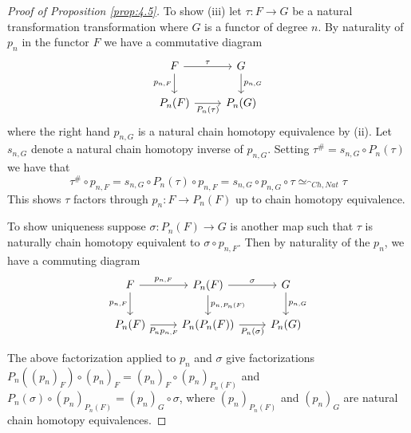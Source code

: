 \begin{proof}[Proof of Proposition \ref{prop:4.5}]
    \vspace{10pt}

    To show (iii) let $\tau:F\rightarrow G$ be a natural transformation transformation where $G$ is a functor of degree $n$. By naturality of $p_n$ in the functor $F$ we have a commutative diagram
    \[\begin{tikzcd}
    	F & G \\
    	{P_n(F)} & {P_n(G)}
    	\arrow["\tau", from=1-1, to=1-2]
    	\arrow["{P_n(\tau)}"', from=2-1, to=2-2]
    	\arrow["{p_{n,F}}"', from=1-1, to=2-1]
    	\arrow["{p_{n,G}}", from=1-2, to=2-2]
    \end{tikzcd}\]
    where the right hand $p_{n,G}$ is a natural chain homotopy equivalence by (ii). Let $s_{n,G}$ denote a natural chain homotopy inverse of $p_{n,G}$. Setting $\tau^\# = s_{n,G}\circ P_n(\tau)$ we have that
    \begin{equation*}
        \tau^\#\circ p_{n,F} = s_{n,G}\circ P_n(\tau)\circ p_{n,F} = s_{n,G}\circ p_{n,G}\circ \tau \simeq_{\cat{Ch},Nat} \tau
    \end{equation*}
    This shows $\tau$ factors through $p_n:F\rightarrow P_n(F)$ up to  chain homotopy equivalence. 
    
    
    To show uniqueness suppose $\sigma:P_n(F)\rightarrow G$ is another map such that $\tau$ is naturally chain homotopy equivalent to $\sigma\circ p_{n,F}$. Then by naturality of the $p_n$, we have a commuting diagram
    \[\begin{tikzcd}
    	F & {P_n(F)} & G \\
    	{P_n(F)} & {P_n(P_n(F))} & {P_n(G)}
    	\arrow["{p_{n,F}}"', from=1-1, to=2-1]
    	\arrow["{P_np_{n,F}}"', from=2-1, to=2-2]
    	\arrow["{p_{n,F}}", from=1-1, to=1-2]
    	\arrow["{p_{n,P_n(F)}}", from=1-2, to=2-2]
    	\arrow["\sigma", from=1-2, to=1-3]
    	\arrow["{p_{n,G}}", from=1-3, to=2-3]
    	\arrow["{P_n(\sigma)}"', from=2-2, to=2-3]
    \end{tikzcd}\]
    
    
    The above factorization applied to $p_n$ and $\sigma$ give factorizations $P_n((p_n)_F)\circ (p_n)_F = (p_n)_F\circ (p_n)_{P_n(F)}$ and $P_n(\sigma)\circ (p_n)_{P_n(F)}=(p_n)_G\circ \sigma$, where $(p_n)_{P_n(F)}$ and $(p_n)_G$ are natural chain homotopy equivalences. 
\end{proof}

